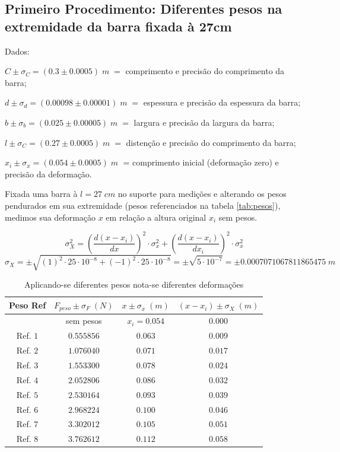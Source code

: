 \documentclass{article}
\begin{document}
\subsection{Primeiro Procedimento: Diferentes pesos na extremidade da barra fixada à 27cm}

Dados:

$C\pm\sigma_C = (0.3\pm0.0005)\;m\;=$ comprimento e precisão do comprimento da barra;

$d\pm\sigma_d = (0.00098\pm0.00001)\;m\;=$ espessura e precisão da espessura da barra;

$b\pm\sigma_b = (0.025\pm0.00005)\;m\;=$ largura e precisão da largura da barra;

$l\pm\sigma_C = (0.27\pm0.0005)\;m\;=$ distenção e precisão do comprimento da barra;

$x_{i}\pm\sigma_x = (0.054\pm0.0005)\;m\;$ = comprimento inicial (deformação zero) e precisão da deformação.

Fixada uma barra à $l = 27\;cm$ no suporte para medições e alterando os pesos pendurados em sua extremidade (pesos referenciados na tabela \ref{tab:pesos}), medimos sua deformação $x$ em relação a altura original $x_i$ sem pesos.

\[\sigma_X^2 = \left(\frac{d(x-x_i)}{dx}\right)^2\cdot\sigma_x^2 + \left(\frac{d(x-x_i)}{dx_i}\right)^2\cdot\sigma_x^2\]
\[\sigma_X = \pm\sqrt{(1)^2\cdot25\cdot10^{-8} + (-1)^2\cdot25\cdot10^{-8}} = \pm\sqrt{5\cdot10^{-7}} = \pm0.0007071067811865475\;m\]

\begin{table}[!ht]
    \centering
    \begin{tabular}{c c|c|c}
        Peso Ref & $F_{peso}\pm\sigma_F\;(N)$ & $x\pm\sigma_x\;(m)$ & $(x - x_i)\pm\sigma_X\;(m)$\\\hline
        & sem pesos & $x_i = 0.054$ & $0.000$\\
        Ref. $1$ & $0.555856$ & $0.063$ & $0.009$\\
        Ref. $2$ & $1.076040$ & $0.071$ & $0.017$\\
        Ref. $3$ & $1.553300$ & $0.078$ & $0.024$\\
        Ref. $4$ & $2.052806$ & $0.086$ & $0.032$\\
        Ref. $5$ & $2.530164$ & $0.093$ & $0.039$\\
        Ref. $6$ & $2.968224$ & $0.100$ & $0.046$\\
        Ref. $7$ & $3.302012$ & $0.105$ & $0.051$\\
        Ref. $8$ & $3.762612$ & $0.112$ & $0.058$\\
    \end{tabular}
    \caption{Aplicando-se diferentes pesos nota-se diferentes deformações}
    \label{tab:p1}
\end{table}
\end{document}
